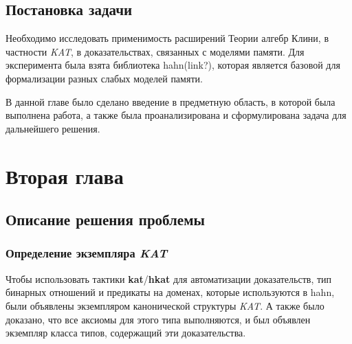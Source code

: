 \documentclass[times
              ]{itmo-student-thesis}
\begin{document}
  \section{Постановка задачи}
    Необходимо исследовать применимость расширений Теории алгебр Клини, в частности \textit{KAT}, в доказательствах, связанных с моделями памяти.
    Для эксперимента была взята библиотека hahn(link?), которая является базовой для формализации разных слабых моделей памяти.


  \chapterconclusion %
    В данной главе было сделано введение в предметную область, в которой была выполнена работа,
    а также была проанализирована и сформулирована задача для дальнейшего решения.
\chapter{Вторая глава}

  \section{Описание решения проблемы}

    \subsection{Определение экземпляра \textit{KAT}}
    Чтобы использовать тактики \textbf{kat}/\textbf{hkat} для автоматизации доказательств,
    тип бинарных отношений и предикаты на доменах, которые используются в hahn, были объявлены экземпляром канонической структуры \textit{KAT}.
    А также было доказано, что все аксиомы для этого типа выполняются, и был объявлен экземпляр класса типов, содержащий эти доказательства.

\end{document}
